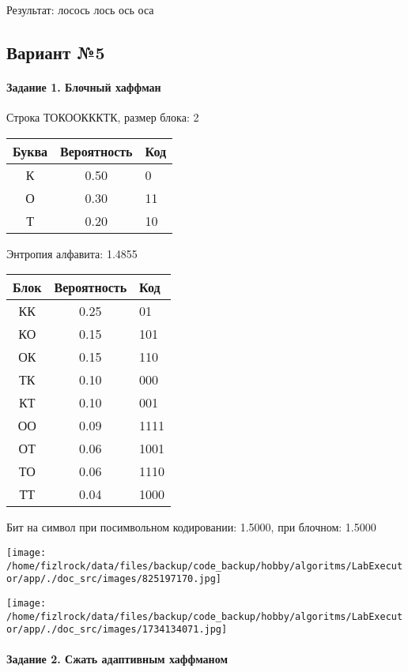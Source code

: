 \documentclass[a4paper, 12pt]{article}
\begin{document}
Результат: лосось лось ось оса
\pagebreak
\subsection{Вариант №5}
\paragraph{Задание 1. Блочный хаффман \\}

Строка ТОКООКККТК, размер блока: 2
\begin{center}
 \begin{tabular}{ |c|c|l| } 
  \hline
     Буква & Вероятность & Код\\ \hline
К & 0.50 & 0\\\hline
О & 0.30 & 11\\\hline
Т & 0.20 & 10
\\ \hline \end{tabular}
\end{center}
Энтропия алфавита: 1.4855
\begin{center}
 \begin{tabular}{ |c|c|l| } 
  \hline
     Блок & Вероятность & Код\\ \hline
КК & 0.25 & 01\\\hline
КО & 0.15 & 101\\\hline
ОК & 0.15 & 110\\\hline
ТК & 0.10 & 000\\\hline
КТ & 0.10 & 001\\\hline
ОО & 0.09 & 1111\\\hline
ОТ & 0.06 & 1001\\\hline
ТО & 0.06 & 1110\\\hline
ТТ & 0.04 & 1000
\\ \hline \end{tabular}
\end{center}
Бит на символ при посимвольном кодировании: 1.5000, при блочном: 1.5000

\texttt{[image: /home/fizlrock/data/files/backup/code\_backup/hobby/algoritms/LabExecutor/app/./doc\_src/images/825197170.jpg]}

\texttt{[image: /home/fizlrock/data/files/backup/code\_backup/hobby/algoritms/LabExecutor/app/./doc\_src/images/1734134071.jpg]}
\pagebreak
\paragraph{Задание 2. Сжать адаптивным хаффманом\\}
\end{document}
